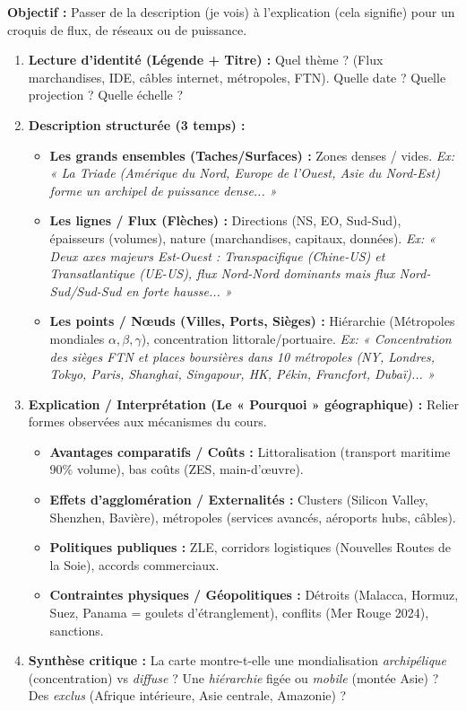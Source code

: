\documentclass[11pt]{article}
\begin{document}
\begin{methode}
    \textbf{Objectif :} Passer de la description (je vois) à l'explication (cela signifie) pour un croquis de flux, de réseaux ou de puissance.
    \begin{enumerate}
        \item \textbf{Lecture d'identité (Légende + Titre) :} Quel thème ? (Flux marchandises, IDE, câbles internet, métropoles, FTN). Quelle date ? Quelle projection ? Quelle échelle ?
        \item \textbf{Description structurée (3 temps) :}
            \begin{itemize}
                \item \textbf{Les grands ensembles (Taches/Surfaces) :} Zones denses / vides. \emph{Ex: « La Triade (Amérique du Nord, Europe de l'Ouest, Asie du Nord-Est) forme un archipel de puissance dense... »}
                \item \textbf{Les lignes / Flux (Flèches) :} Directions (NS, EO, Sud-Sud), épaisseurs (volumes), nature (marchandises, capitaux, données). \emph{Ex: « Deux axes majeurs Est-Ouest : Transpacifique (Chine-US) et Transatlantique (UE-US), flux Nord-Nord dominants mais flux Nord-Sud/Sud-Sud en forte hausse... »}
                \item \textbf{Les points / Nœuds (Villes, Ports, Sièges) :} Hiérarchie (Métropoles mondiales $\alpha, \beta, \gamma$), concentration littorale/portuaire. \emph{Ex: « Concentration des sièges FTN et places boursières dans 10 métropoles (NY, Londres, Tokyo, Paris, Shanghai, Singapour, HK, Pékin, Francfort, Dubaï)... »}
            \end{itemize}
        \item \textbf{Explication / Interprétation (Le « Pourquoi » géographique) :} Relier formes observées aux mécanismes du cours.
            \begin{itemize}
                \item \textbf{Avantages comparatifs / Coûts :} Littoralisation (transport maritime 90\% volume), bas coûts (ZES, main-d'œuvre).
                \item \textbf{Effets d'agglomération / Externalités :} Clusters (Silicon Valley, Shenzhen, Bavière), métropoles (services avancés, aéroports hubs, câbles).
                \item \textbf{Politiques publiques :} ZLE, corridors logistiques (Nouvelles Routes de la Soie), accords commerciaux.
                \item \textbf{Contraintes physiques / Géopolitiques :} Détroits (Malacca, Hormuz, Suez, Panama = goulets d'étranglement), conflits (Mer Rouge 2024), sanctions.
            \end{itemize}
        \item \textbf{Synthèse critique :} La carte montre-t-elle une mondialisation \emph{archipélique} (concentration) vs \emph{diffuse} ? Une \emph{hiérarchie} figée ou \emph{mobile} (montée Asie) ? Des \emph{exclus} (Afrique intérieure, Asie centrale, Amazonie) ?
    \end{enumerate}
\end{methode}
\end{document}
